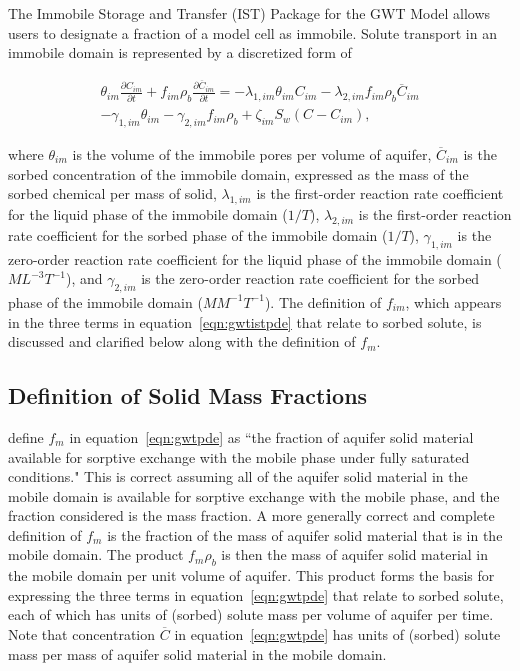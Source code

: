 The Immobile Storage and Transfer (IST) Package for the GWT Model allows users to designate a fraction of a model cell as immobile. Solute transport in an immobile domain is represented by a discretized form of

\begin{equation}
\label{eqn:gwtistpde}
\begin{split}
\theta_{im} \frac{\partial C_{im} }{\partial t} + f_{im} \rho_b \frac{\partial \overline{C}_{im}}{\partial t} = 
- \lambda_{1,im} \theta_{im} C_{im} - \lambda_{2,im}  f_{im} \rho_b \overline{C}_{im} \\
- \gamma_{1,im} \theta_{im} - \gamma_{2,im} f_{im}  \rho_b 
+ \zeta_{im} S_w \left ( C - C_{im} \right ),
\end{split}
\end{equation}

\noindent where $\theta_{im}$ is the volume of the immobile pores per volume of aquifer, $\overline{C}_{im}$ is the sorbed concentration of the immobile domain, expressed as the mass of the sorbed chemical per mass of solid,  $\lambda_{1,im}$ is the first-order reaction rate coefficient for the liquid phase of the immobile domain ($1/T$), $\lambda_{2,im}$ is the first-order reaction rate coefficient for the sorbed phase of the immobile domain ($1/T$), $\gamma_{1,im}$ is the zero-order reaction rate coefficient for the liquid phase of the immobile domain ($ML^{-3}T^{-1}$), and $\gamma_{2,im}$ is the zero-order reaction rate coefficient for the sorbed phase of the immobile domain ($M M^{-1}T^{-1}$). The definition of $f_{im}$, which appears in the three terms in equation~\ref{eqn:gwtistpde} that relate to sorbed solute, is discussed and clarified below along with the definition of $f_m$.

\subsection{Definition of Solid Mass Fractions} \label{sec:solidmassfrac0}

\cite{modflow6gwt} define $f_m$ in equation~\ref{eqn:gwtpde} as ``the fraction of aquifer solid material available for sorptive exchange with the mobile phase under fully saturated conditions." This is correct assuming all of the aquifer solid material in the mobile domain is available for sorptive exchange with the mobile phase, and the fraction considered is the mass fraction. A more generally correct and complete definition of $f_m$ is the fraction of the mass of aquifer solid material that is in the mobile domain. The product $f_m \rho_b$ is then the mass of aquifer solid material in the mobile domain per unit volume of aquifer. This product forms the basis for expressing the three terms in equation~\ref{eqn:gwtpde} that relate to sorbed solute, each of which has units of (sorbed) solute mass per volume of aquifer per time. Note that concentration $\overline{C}$ in equation~\ref{eqn:gwtpde} has units of (sorbed) solute mass per mass of aquifer solid material in the mobile domain.

